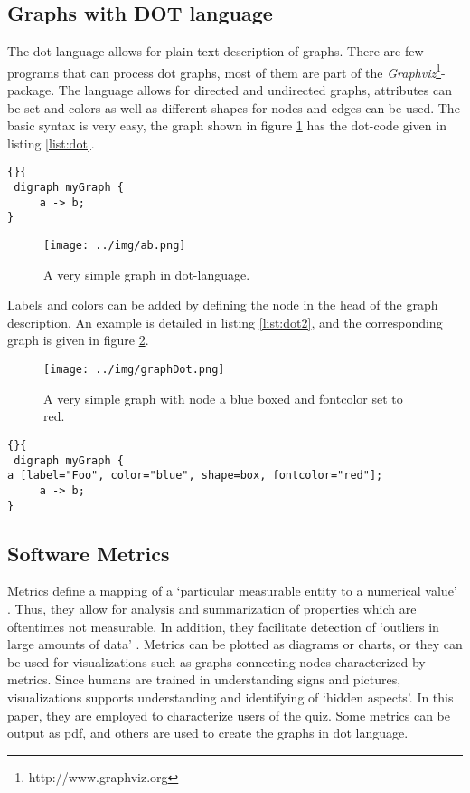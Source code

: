 \documentclass[preprint,12pt]{elsarticle}
\begin{document}
\subsection{Graphs with DOT language}
\label{sec:graph-repr-with}
The \ac{dot} language allows for plain text description of
graphs. There are few programs that can process \ac{dot} graphs, most
of them are part of the
\textit{Graphviz}\footnote{http://www.graphviz.org}-package. 
The language allows for directed and undirected graphs, attributes can
be set and colors as well as different shapes for nodes and edges can
be used. The basic syntax is very easy, the graph shown in figure
\ref{fig:dot} has the \ac{dot}-code given in listing \ref{list:dot}.

\begin{lstlisting}[caption=A very simple DOT-Graph,
  label=list:dot]{}{
 digraph myGraph {
     a -> b;
}
\end{lstlisting}

\begin{figure}
  \texttt{[image: ../img/ab.png]}
\caption{A very simple graph in \ac{dot}-language.}
\label{fig:dot}
\end{figure}

Labels and colors can be added by defining the node in the head of the
graph description. An example is detailed in listing \ref{list:dot2}, and
the corresponding graph is given in figure \ref{fig:dot2}.


\begin{figure}
  \texttt{[image: ../img/graphDot.png]}
\caption{A very simple graph with node a blue boxed and fontcolor set
  to red.}
\label{fig:dot2}
\end{figure}


\begin{lstlisting}[caption=A very simple DOT-Graph,
  label=list:dot2]{}{
 digraph myGraph {
a [label="Foo", color="blue", shape=box, fontcolor="red"];
     a -> b;
}
\end{lstlisting}

\subsection{Software Metrics}
\label{sec:metrics}
Metrics define a mapping of a `particular measurable entity to a
numerical value' \cite{Lanz06a}. Thus, they allow for analysis and summarization
of properties which are oftentimes not measurable. In addition, they
facilitate detection of `outliers in large amounts of data'
\cite{Lanz06a}. Metrics can be plotted as diagrams or charts, or they
can be used for visualizations such as graphs connecting nodes
characterized by metrics. Since humans are trained in understanding signs and
pictures, visualizations supports understanding and identifying of
`hidden aspects'. \cite{Lanz06a} In this paper, they are
employed to characterize users of the quiz. Some metrics can be output
as \ac{pdf}, and others are used to create the graphs in \ac{dot} language.
\end{document}
